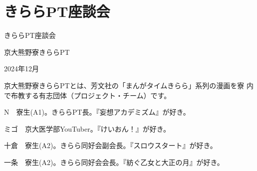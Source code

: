 \section{きららPT座談会}

\vspace{5mm}
\centerline{\Huge きららPT座談会}
\vspace{5mm}
\centerline{\Large 京大熊野寮きららPT}
\vspace{2mm}
\centerline{\Large 2024年12月}
\vspace{2mm}

\begin{multicols}{2}
\begin{description}
  \item 京大熊野寮きららPTとは、芳文社の「まんがタイムきらら」系列の漫画を寮
内で布教する有志団体（プロジェクト・チーム）です。
\end{description}

\vspace{6mm}

\begin{description}
  \item{N}　寮生(A1)。きららPT長。『妄想アカデミズム』が好き。
  \item{ミゴ}　京大医学部YouTuber。『けいおん！』が好き。
  \item{十倉}　寮生(A2)。きらら同好会副会長。『スロウスタート』が好き。
  \item{一条}　寮生(A2)。きらら同好会会長。『紡ぐ乙女と大正の月』が好き。
\end{description}

\vspace{6mm}


\end{multicols}
